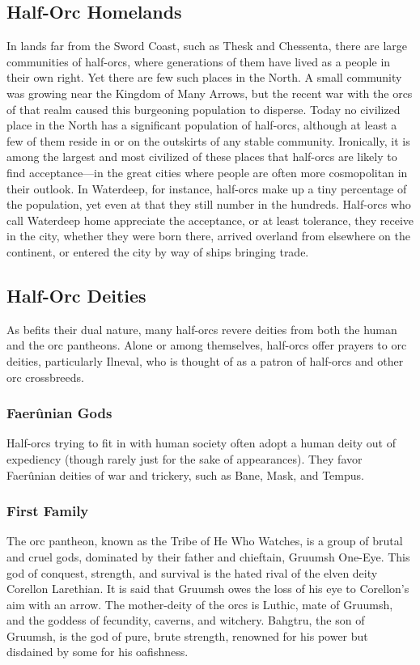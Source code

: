 \documentclass[10pt,a4paper,twoside,twocolumn,openany,bg=print,nodeprecatedcode]{dndbook}
\begin{document}
\subsection{Half-Orc Homelands}
In lands far from the Sword Coast, such as Thesk and Chessenta, there are large communities of half-orcs, where generations of them have lived as a people in their own right. Yet there are few such places in the North. A small community was growing near the Kingdom of Many Arrows, but the recent war with the orcs of that realm caused this burgeoning population to disperse.
Today no civilized place in the North has a significant population of half-orcs, although at least a few of them reside in or on the outskirts of any stable community. Ironically, it is among the largest and most civilized of these places that half-orcs are likely to find acceptance—in the great cities where people are often more cosmopolitan in their outlook.
In Waterdeep, for instance, half-orcs make up a tiny percentage of the population, yet even at that they still number in the hundreds. Half-orcs who call Waterdeep home appreciate the acceptance, or at least tolerance, they receive in the city, whether they were born there, arrived overland from elsewhere on the continent, or entered the city by way of ships bringing trade.
\subsection{Half-Orc Deities}
As befits their dual nature, many half-orcs revere deities from both the human and the orc pantheons. Alone or among themselves, half-orcs offer prayers to orc deities, particularly Ilneval, who is thought of as a patron of half-orcs and other orc crossbreeds.
\subsubsection{Faerûnian Gods}
Half-orcs trying to fit in with human society often adopt a human deity out of expediency (though rarely just for the sake of appearances). They favor Faerûnian deities of war and trickery, such as Bane, Mask, and Tempus.
\subsubsection{First Family}
The orc pantheon, known as the Tribe of He Who Watches, is a group of brutal and cruel gods, dominated by their father and chieftain, Gruumsh One-Eye. This god of conquest, strength, and survival is the hated rival of the elven deity Corellon Larethian. It is said that Gruumsh owes the loss of his eye to Corellon's aim with an arrow.
The mother-deity of the orcs is Luthic, mate of Gruumsh, and the goddess of fecundity, caverns, and witchery.
Bahgtru, the son of Gruumsh, is the god of pure, brute strength, renowned for his power but disdained by some for his oafishness.
\end{document}
